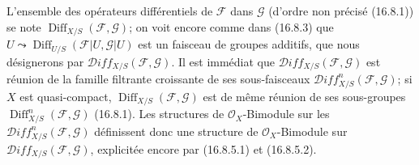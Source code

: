 \begin{env}[16.8.7]
\label{IV.16.8.7}
L'ensemble des opérateurs différentiels de $\mathscr{F}$ dans $\mathscr{G}$
(d'ordre non précisé (16.8.1)) se note
$\operatorname{Diff}_{X/S}(\mathscr{F},\mathscr{G})$; on voit encore comme
dans (16.8.3) que
$U\leadsto\operatorname{Diff}_{U/S}(\mathscr{F}|U,\mathscr{G}|U)$ est un
faisceau de groupes additifs, que nous désignerons par
$\mathscr{D}\!iff_{X/S}(\mathscr{F},\mathscr{G})$. Il est immédiat que
$\mathscr{D}\!iff_{X/S}(\mathscr{F},\mathscr{G})$ est réunion de la famille
filtrante croissante de ses sous-faisceaux
$\mathscr{D}\!iff_{X/S}^n(\mathscr{F},\mathscr{G})$; si $X$ est
quasi-compact, $\operatorname{Diff}_{X/S}(\mathscr{F},\mathscr{G})$
est de même réunion de ses sous-groupes
$\operatorname{Diff}_{X/S}^n(\mathscr{F},\mathscr{G})$ (16.8.1). Les
structures de $\mathcal{O}_X$-Bimodule sur les
$\mathscr{D}\!iff_{X/S}^n(\mathscr{F},\mathscr{G})$ définissent donc une
structure de $\mathcal{O}_X$-Bimodule sur
$\mathscr{D}\!iff_{X/S}(\mathscr{F},\mathscr{G})$, explicitée encore par
(16.8.5.1) et (16.8.5.2).


\end{env}
